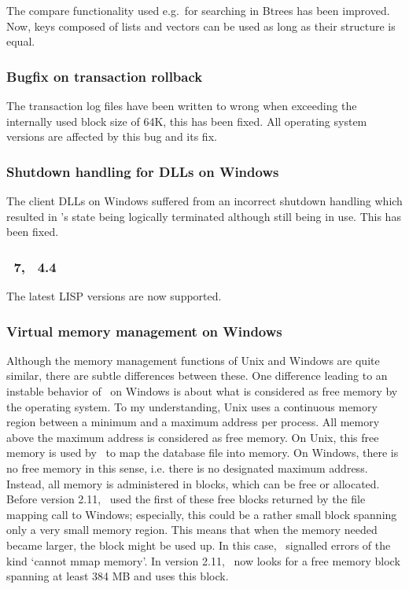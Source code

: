 The compare functionality used e.g.\ for searching in Btrees has been
improved. Now, keys composed of lists and vectors can be used as long
as their structure is equal.

\subsubsection{Bugfix on transaction rollback}

The transaction log files have been written to wrong when exceeding
the internally used block size of 64K, this has been fixed. All
operating system versions are affected by this bug and its fix.

\subsubsection{Shutdown handling for DLLs on Windows}

The client DLLs on Windows suffered from an incorrect shutdown
handling which resulted in \plob's state being logically terminated
although still being in use. This has been fixed.

\subsubsection{\protect\allegrocl\ 7, \protect\lwcl\ 4.4}

The latest LISP versions are now supported.

\subsubsection{Virtual memory management on Windows}

Although the memory management functions of Unix and Windows are quite
similar, there are subtle differences between these. One difference
leading to an instable behavior of \plob\ on Windows is about what is
considered as free memory by the operating system. To my
understanding, Unix uses a continuous memory region between a minimum
and a maximum address per process.  All memory above the maximum
address is considered as free memory. On Unix, this free memory is
used by \plob\ to map the database file into memory. On Windows, there
is no free memory in this sense, i.e. there is no designated maximum
address. Instead, all memory is administered in blocks, which can be
free or allocated. Before version 2.11, \plob\ used the first of these
free blocks returned by the file mapping call to Windows; especially,
this could be a rather small block spanning only a very small memory
region. This means that when the memory needed became larger, the
block might be used up. In this case, \plob\ signalled errors of the
kind `cannot mmap memory'. In version 2.11, \plob\ now looks for a
free memory block spanning at least 384 MB and uses this block.

